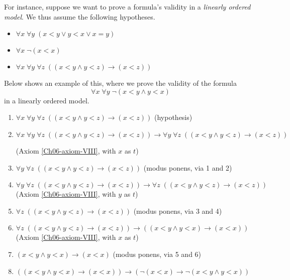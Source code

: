 For instance, suppose we want to prove a formula's validity in a \emph{linearly ordered model}. We thus assume the following hypotheses.
%
\begin{itemize}
    \item \(\forall x\; \forall y\; (x < y \lor y < x \lor x = y)\)
    \item \(\forall x\; \neg(x < x)\)
    \item \(\forall x\; \forall y\; \forall z\; ((x < y \land y < z) \rightarrow (x < z))\)
\end{itemize}
%
Below shows an example of this, where we prove the validity of the formula
%
\[\forall x\; \forall y\; \neg(x < y \land y < x)\]
%
in a linearly ordered model.
%
\begin{enumerate}
    \item \(\forall x\; \forall y\; \forall z\; ((x < y \land y < z) \rightarrow (x < z))\)
    \hfill (hypothesis)

    \item \(\forall x\; \forall y\; \forall z\; ((x < y \land y < z) \rightarrow (x < z)) \rightarrow \forall y\; \forall z\; ((x < y \land y < z) \rightarrow (x < z))\)
    
    \hfill (Axiom \ref{Ch06-axiom-VIII}, with \(x\) as \(t\))

    \item \(\forall y\; \forall z\; ((x < y \land y < z) \rightarrow (x < z))\)
    \hfill (modus ponens, via 1 and 2)

    \item \(\forall y\; \forall z\; ((x < y \land y < z) \rightarrow (x < z)) \rightarrow \forall z\; ((x < y \land y < z) \rightarrow (x < z))\)
    \hfill (Axiom \ref{Ch06-axiom-VIII}, with \(y\) as \(t\))

    \item \(\forall z\; ((x < y \land y < z) \rightarrow (x < z))\)
    \hfill (modus ponens, via 3 and 4)

    \item \(\forall z\; ((x < y \land y < z) \rightarrow (x < z)) \rightarrow ((x < y \land y < x) \rightarrow (x < x))\)
    \hfill (Axiom \ref{Ch06-axiom-VIII}, with \(x\) as \(t\))

    \item \((x < y \land y < x) \rightarrow (x < x)\)
    \hfill (modus ponens, via 5 and 6)

    \item \(((x < y \land y < x) \rightarrow (x < x)) \rightarrow (\neg(x < x) \rightarrow \neg(x < y \land y < x))\)
    

\end{enumerate}
